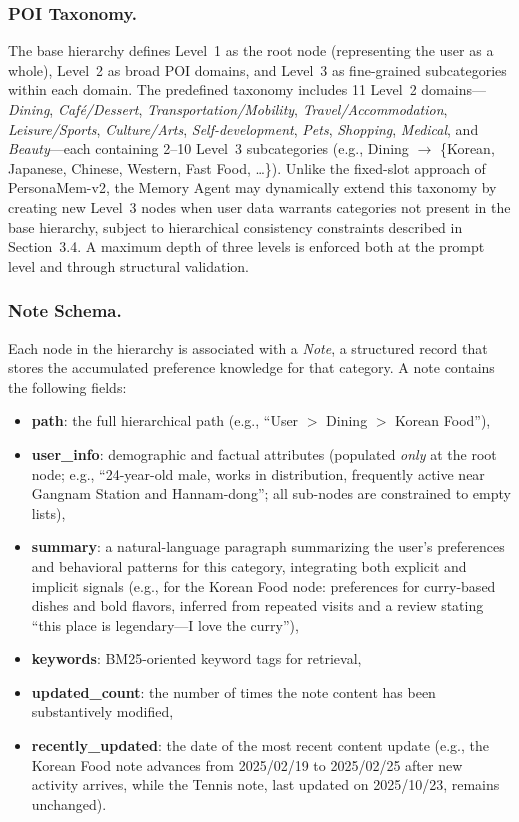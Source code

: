 \documentclass[manuscript,screen,review]{acmart}
\begin{document}
\subsubsection{POI Taxonomy.}
The base hierarchy defines Level~1 as the root node (representing the user as a whole), Level~2 as broad POI domains, and Level~3 as fine-grained subcategories within each domain. The predefined taxonomy includes 11 Level~2 domains---\textit{Dining}, \textit{Caf\'{e}/Dessert}, \textit{Transportation/Mobility}, \textit{Travel/Accommodation}, \textit{Leisure/Sports}, \textit{Culture/Arts}, \textit{Self-development}, \textit{Pets}, \textit{Shopping}, \textit{Medical}, and \textit{Beauty}---each containing 2--10 Level~3 subcategories (e.g., Dining $\rightarrow$ \{Korean, Japanese, Chinese, Western, Fast Food, \ldots\}). Unlike the fixed-slot approach of PersonaMem-v2, the Memory Agent may dynamically extend this taxonomy by creating new Level~3 nodes when user data warrants categories not present in the base hierarchy, subject to hierarchical consistency constraints described in Section~3.4. A maximum depth of three levels is enforced both at the prompt level and through structural validation.

\subsubsection{Note Schema.}
Each node in the hierarchy is associated with a \textit{Note}, a structured record that stores the accumulated preference knowledge for that category. A note contains the following fields:

\begin{itemize}
    \item \textbf{path}: the full hierarchical path (e.g., ``User $>$ Dining $>$ Korean Food''),
    \item \textbf{user\_info}: demographic and factual attributes (populated \textit{only} at the root node; e.g., ``24-year-old male, works in distribution, frequently active near Gangnam Station and Hannam-dong''; all sub-nodes are constrained to empty lists),
    \item \textbf{summary}: a natural-language paragraph summarizing the user's preferences and behavioral patterns for this category, integrating both explicit and implicit signals (e.g., for the Korean Food node: preferences for curry-based dishes and bold flavors, inferred from repeated visits and a review stating ``this place is legendary---I love the curry''),
    \item \textbf{keywords}: BM25-oriented keyword tags for retrieval,
    \item \textbf{updated\_count}: the number of times the note content has been substantively modified,
    \item \textbf{recently\_updated}: the date of the most recent content update (e.g., the Korean Food note advances from 2025/02/19 to 2025/02/25 after new activity arrives, while the Tennis note, last updated on 2025/10/23, remains unchanged).
\end{itemize}
\end{document}
